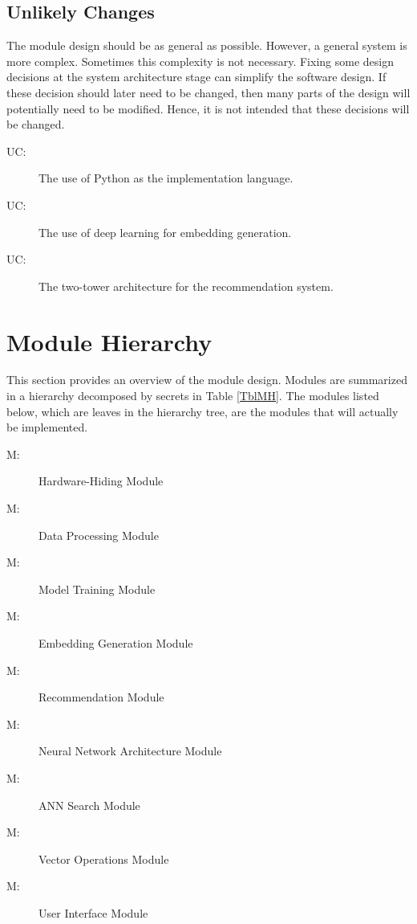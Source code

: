 \documentclass[12pt, titlepage]{article}
\newcounter{ucnum}
\newcommand{\uctheucnum}{UC\theucnum}
\newcounter{mnum}
\newcommand{\mthemnum}{M\themnum}
\begin{document}
\subsection{Unlikely Changes} \label{SecUchange}

The module design should be as general as possible. However, a general system is
more complex. Sometimes this complexity is not necessary. Fixing some design
decisions at the system architecture stage can simplify the software design. If
these decision should later need to be changed, then many parts of the design
will potentially need to be modified. Hence, it is not intended that these
decisions will be changed.

\begin{description}
\item[ \uctheucnum \label{ucImplementation}:] The use of Python as the implementation language.
\item[ \uctheucnum \label{ucDeepLearning}:] The use of deep learning for embedding generation.
\item[ \uctheucnum \label{ucTTE}:] The two-tower architecture for the recommendation system.
\end{description}

\section{Module Hierarchy} \label{SecMH}

This section provides an overview of the module design. Modules are summarized
in a hierarchy decomposed by secrets in Table \ref{TblMH}. The modules listed
below, which are leaves in the hierarchy tree, are the modules that will
actually be implemented.

\begin{description}
\item [ \mthemnum \label{mHH}:] Hardware-Hiding Module
\item [ \mthemnum \label{mDP}:] Data Processing Module
\item [ \mthemnum \label{mMT}:] Model Training Module
\item [ \mthemnum \label{mEG}:] Embedding Generation Module
\item [ \mthemnum \label{mRe}:] Recommendation Module
\item [ \mthemnum \label{mNN}:] Neural Network Architecture Module
\item [ \mthemnum \label{mANN}:] ANN Search Module
\item [ \mthemnum \label{mVO}:] Vector Operations Module
\item [ \mthemnum \label{mUI}:] User Interface Module
\end{description}
\end{document}
